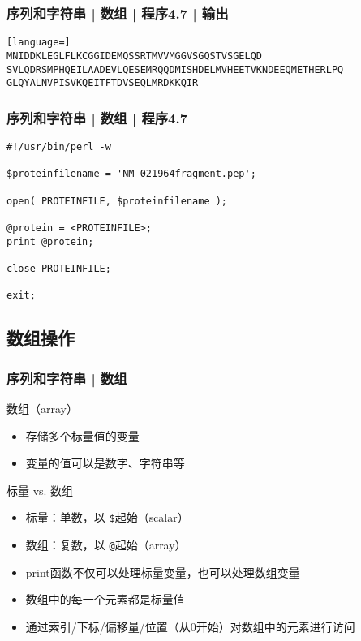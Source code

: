 \begin{frame}[fragile]
  \frametitle{序列和字符串 | 数组 | 程序4.7 | 输出}
\begin{lstlisting}[language=]
MNIDDKLEGLFLKCGGIDEMQSSRTMVVMGGVSGQSTVSGELQD
SVLQDRSMPHQEILAADEVLQESEMRQQDMISHDELMVHEETVKNDEEQMETHERLPQ
GLQYALNVPISVKQEITFTDVSEQLMRDKKQIR
\end{lstlisting}
\end{frame}

\begin{frame}[fragile]
  \frametitle{序列和字符串 | 数组 | \alert{程序4.7}}
\begin{lstlisting}
#!/usr/bin/perl -w

$proteinfilename = 'NM_021964fragment.pep';

open( PROTEINFILE, $proteinfilename );

@protein = <PROTEINFILE>;
print @protein;

close PROTEINFILE;

exit;
\end{lstlisting}
\end{frame}

\subsection{数组操作}
\begin{frame}[fragile]
  \frametitle{序列和字符串 | \alert{数组}}
  \begin{block}{数组（array）}
    \begin{itemize}
      \item 存储多个标量值的变量
      \item 变量的值可以是数字、字符串等
    \end{itemize}
  \end{block}
  \pause
  \begin{block}{标量 vs. 数组}
    \begin{itemize}
      \item 标量：单数，以 \verb|$|起始（scalar）
      \item 数组：复数，以 \verb|@|起始（array）
      \item print函数不仅可以处理标量变量，也可以处理数组变量
      \item 数组中的每一个元素都是标量值
      \item 通过索引/下标/偏移量/位置（从0开始）对数组中的元素进行访问
    \end{itemize}
  \end{block}
\end{frame}

